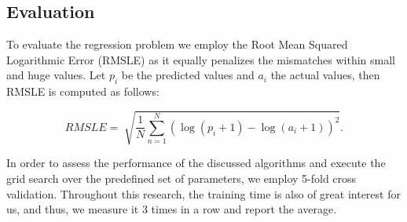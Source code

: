 \subsection{Evaluation}

To evaluate the regression problem we employ the Root Mean Squared Logarithmic Error (RMSLE) as it equally penalizes the mismatches within small and huge values. Let $p_i$ be the predicted values and $a_i$ the actual values, then RMSLE is computed as follows:

$$ RMSLE = \sqrt[]{\frac{1}{N}\sum_{n = 1}^N (\log(p_i + 1) - \log(a_i + 1))^2}. $$

In order to assess the performance of the discussed algorithms and execute the grid search over the predefined set of parameters, we employ 5-fold cross validation. Throughout this research, the training time is also of great interest for us, and thus, we measure it 3 times in a row and report the average.



